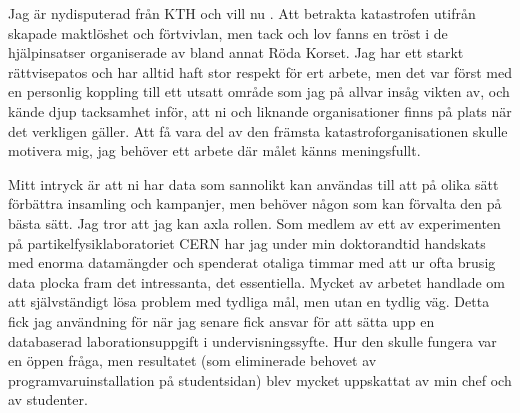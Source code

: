 \documentclass[11pt, a4paper]{../awesome-cv} %
\begin{document}
\makecvheader %

\makelettertitle %


\begin{cvletter}

Jag är nydisputerad från KTH och vill nu . 
Att betrakta katastrofen utifr{\aa}n skapade maktl{\"o}shet och f{\"o}rtvivlan, men tack och lov fanns en tröst i de hjälpinsatser organiserade av bland annat Röda Korset. %
Jag har ett starkt r{\"a}ttvisepatos och har alltid haft stor respekt f{\"o}r ert arbete, %
men det var f{\"o}rst med en personlig koppling till ett utsatt omr{\aa}de som jag p{\aa} allvar ins{\aa}g vikten av, och k{\"a}nde djup tacksamhet inför, att ni och liknande organisationer finns p{\aa} plats n{\"a}r det verkligen g{\"a}ller. 
Att få vara del av den fr{\"a}msta katastroforganisationen skulle motivera mig, jag beh{\"o}ver ett arbete d{\"a}r målet känns meningsfullt. 

Mitt intryck {\"a}r att ni har data som sannolikt kan anv{\"a}ndas till att p{\aa} olika s{\"a}tt f{\"o}rb{\"a}ttra insamling och kampanjer, men beh{\"o}ver n{\aa}gon som kan f{\"o}rvalta den p{\aa} b{\"a}sta s{\"a}tt. %
Jag tror att jag kan axla rollen.
Som medlem av ett av experimenten på partikelfysiklaboratoriet CERN har jag under min doktorandtid handskats med enorma datamängder och spenderat otaliga timmar med att ur ofta brusig data plocka fram det intressanta, det essentiella. %
Mycket av arbetet handlade om att sj{\"a}lvst{\"a}ndigt l{\"o}sa problem med tydliga m{\aa}l, men utan en tydlig v{\"a}g.
Detta fick jag användning för när jag senare fick ansvar för att s{\"a}tta upp en databaserad laborationsuppgift i undervisningssyfte. 
Hur den skulle fungera var en öppen fråga, men resultatet (som eliminerade behovet av programvaruinstallation på studentsidan) blev mycket uppskattat av min chef och av studenter.



\end{cvletter}
\end{document}

